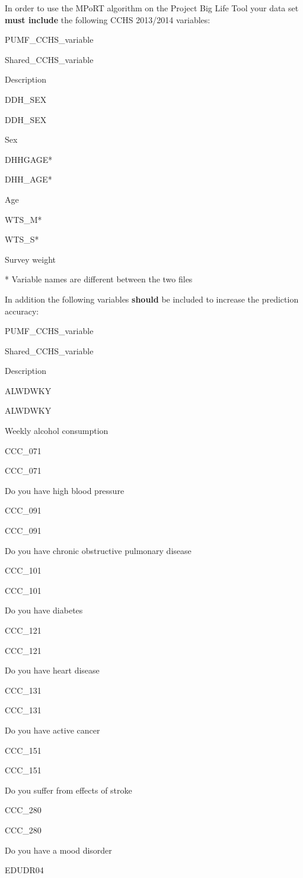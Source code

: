 \documentclass[]{book}
\begin{document}
In order to use the MPoRT algorithm on the Project Big Life Tool your
data set \textbf{must include} the following CCHS 2013/2014 variables:

PUMF\_CCHS\_variable

Shared\_CCHS\_variable

Description

DDH\_SEX

DDH\_SEX

Sex

DHHGAGE*

DHH\_AGE*

Age

WTS\_M*

WTS\_S*

Survey weight

* Variable names are different between the two files

In addition the following variables \textbf{should} be included to
increase the prediction accuracy:

PUMF\_CCHS\_variable

Shared\_CCHS\_variable

Description

ALWDWKY

ALWDWKY

Weekly alcohol consumption

CCC\_071

CCC\_071

Do you have high blood pressure

CCC\_091

CCC\_091

Do you have chronic obstructive pulmonary disease

CCC\_101

CCC\_101

Do you have diabetes

CCC\_121

CCC\_121

Do you have heart disease

CCC\_131

CCC\_131

Do you have active cancer

CCC\_151

CCC\_151

Do you suffer from effects of stroke

CCC\_280

CCC\_280

Do you have a mood disorder

EDUDR04
\end{document}
